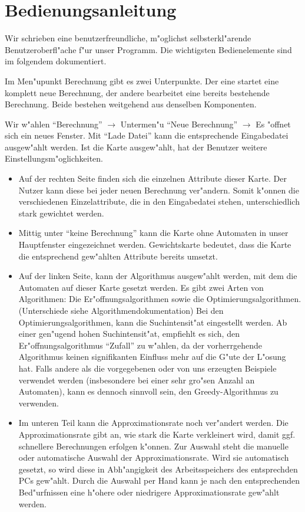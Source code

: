 \section{Bedienungsanleitung}
Wir schrieben eine benutzerfreundliche, m"oglichst selbsterkl"arende  Benutzeroberfl"ache f"ur unser Programm. Die wichtigsten Bedienelemente sind im folgendem dokumentiert.

Im Men"upunkt Berechnung gibt es zwei Unterpunkte. Der eine startet eine komplett neue Berechnung, der andere bearbeitet eine bereits bestehende Berechnung. Beide bestehen weitgehend aus denselben Komponenten.

Wir w"ahlen "`Berechnung"'  $\rightarrow$ Untermen"u   "`Neue Berechnung"' $\rightarrow$ Es "offnet sich ein neues Fenster. Mit "`Lade Datei"' kann die entsprechende Eingabedatei ausgew"ahlt werden.
Ist die Karte ausgew"ahlt, hat der Benutzer weitere Einstellungsm"oglichkeiten.
\begin{itemize} 
\item Auf der rechten Seite finden sich die einzelnen Attribute dieser Karte. Der Nutzer kann diese bei jeder neuen Berechnung ver"andern. Somit k"onnen die verschiedenen Einzelattribute, die in den Eingabedatei stehen, unterschiedlich stark gewichtet werden.
\item Mittig unter "`keine Berechnung"' kann die Karte ohne Automaten in unser Hauptfenster eingezeichnet werden. Gewichtskarte bedeutet, dass die Karte die entsprechend gew"ahlten Attribute bereits umsetzt.
\item Auf der linken Seite, kann der Algorithmus ausgew"ahlt werden, mit dem die Automaten auf dieser Karte gesetzt werden. Es gibt zwei Arten von Algorithmen: Die Er"offnungsalgorithmen sowie die Optimierungsalgorithmen. (Unterschiede siehe Algorithmendokumentation)
Bei den Optimierungsalgorithmen, kann die Suchintensit"at eingestellt werden. Ab einer gen"ugend hohen Suchintensit"at, empfiehlt es sich, den Er"offnungsalgorithmus "`Zufall"' zu w"ahlen, da der vorherrgehende Algorithmus keinen signifikanten Einfluss mehr auf die G"ute der L"osung hat. Falls andere als die vorgegebenen oder von uns erzeugten Beispiele verwendet werden (insbesondere bei einer sehr gro"sen Anzahl an Automaten), kann es dennoch sinnvoll sein, den Greedy-Algorithmus zu verwenden.
\item Im unteren Teil kann die Approximationsrate noch ver"andert werden. Die Approximationsrate gibt an, wie stark die Karte verkleinert wird, damit ggf. schnellere Berechnungen erfolgen k"onnen. Zur Auswahl steht die manuelle oder automatische Auswahl der Approximationsrate. Wird sie automatisch gesetzt, so wird diese in Abh"angigkeit des Arbeitsspeichers des entsprechden PCs gew"ahlt. Durch die Auswahl per Hand kann je nach den entsprechenden Bed"urfnissen eine h"ohere oder niedrigere Approximationsrate gew"ahlt werden.
\end{itemize}
